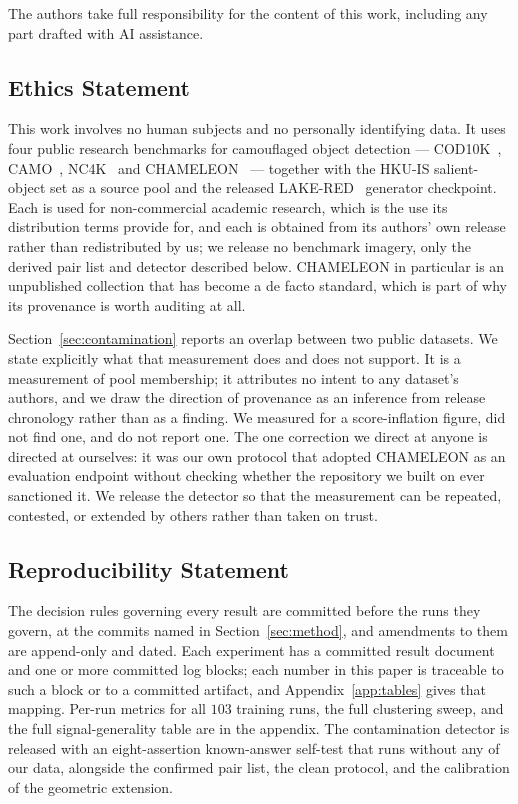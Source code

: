 \documentclass{article} %
\begin{document}
The authors take full responsibility for the content of this work, including any part drafted with
AI assistance.

\subsection*{Ethics Statement}

This work involves no human subjects and no personally identifying data. It uses four public
research benchmarks for camouflaged object detection --- COD10K~\cite{fan2022concealed},
CAMO~\cite{le2019anabranch}, NC4K~\cite{lv2021simultaneously} and
CHAMELEON~\cite{skurowski2018animal} --- together with the HKU-IS salient-object set as a source
pool and the released LAKE-RED~\cite{zhao2024lakered} generator checkpoint. Each is used for
non-commercial academic research, which is the use its distribution terms provide for, and each is
obtained from its authors' own release rather than redistributed by us; we release no benchmark
imagery, only the derived pair list and detector described below.
CHAMELEON in particular is an unpublished collection that has become a de facto standard, which is
part of why its provenance is worth auditing at all.

Section~\ref{sec:contamination} reports an overlap between two public datasets. We state explicitly
what that measurement does and does not support. It is a measurement of pool membership; it attributes
no intent to any dataset's authors, and we draw the direction of provenance as an inference from
release chronology rather than as a finding. We measured for a score-inflation figure, did not find
one, and do not report one. The one correction we direct at anyone is directed at ourselves: it was
our own protocol that adopted CHAMELEON as an evaluation endpoint without checking whether the
repository we built on ever sanctioned it. We release the detector so that the measurement can be
repeated, contested, or extended by others rather than taken on trust.

\subsection*{Reproducibility Statement}

The decision rules governing every result are committed before the runs they govern, at the commits
named in Section~\ref{sec:method}, and amendments to them are append-only and dated. Each experiment
has a committed result document and one or more committed log blocks; each number in this paper is
traceable to such a block or to a committed artifact, and Appendix~\ref{app:tables} gives that
mapping. Per-run metrics for all $103$ training runs, the full clustering sweep, and the full
signal-generality table are in the appendix. The contamination detector is released with an
eight-assertion known-answer self-test that runs without any of our data, alongside the confirmed
pair list, the clean protocol, and the calibration of the geometric extension.
\end{document}
